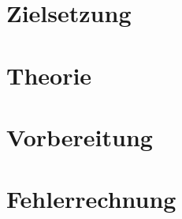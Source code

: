 


\section{Zielsetzung}
\label{sec:Theorie}

\section{Theorie}

\section{Vorbereitung}

\section{Fehlerrechnung}
